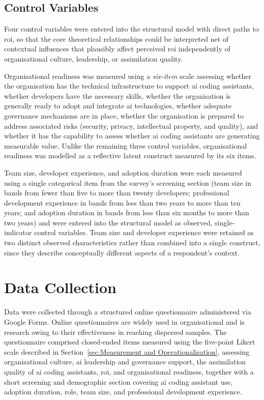\subsection{Control Variables}
\label{sec:Control Variables}
Four control variables were entered into the structural model with direct paths to \gls{roi}, so that the core theoretical relationships could be interpreted net of contextual influences that plausibly affect perceived \gls{roi} independently of organisational culture, leadership, or assimilation quality.

Organisational readiness was measured using a \textit{six-item} scale assessing whether the organisation has the technical infrastructure to support \gls{ai} coding assistants, whether developers have the necessary skills, whether the organisation is generally ready to adopt and integrate \gls{ai} technologies, whether adequate governance mechanisms are in place, whether the organisation is prepared to address associated risks (security, privacy, intellectual property, and quality), and whether it has the capability to assess whether \gls{ai} coding assistants are generating measurable value. Unlike the remaining three control variables, organisational readiness was modelled as a reflective latent construct measured by its six items.

Team size, developer experience, and adoption duration were each measured using a single categorical item from the survey's screening section (team size in bands from fewer than five to more than twenty developers; professional development experience in bands from less than two years to more than ten years; and adoption duration in bands from less than six months to more than two years) and were entered into the structural model as observed, single-indicator control variables. Team size and developer experience were retained as two distinct observed characteristics rather than combined into a single construct, since they describe conceptually different aspects of a respondent's context.

\section{Data Collection}
\label{sec:Data Collection}
Data were collected through a structured online questionnaire administered via Google Forms. Online questionnaires are widely used in organisational and \gls{is} research owing to their effectiveness in reaching dispersed samples. The questionnaire comprised closed-ended items measured using the five-point Likert scale described in Section~\ref{sec:Measurement and Operationalisation}, assessing organisational culture, \gls{ai} leadership and governance support, the assimilation quality of \gls{ai} coding assistants, \gls{roi}, and organisational readiness, together with a short screening and demographic section covering \gls{ai} coding assistant use, adoption duration, role, team size, and professional development experience.

